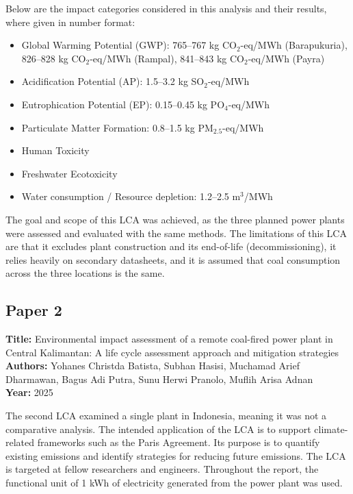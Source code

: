 \documentclass[9pt]{extarticle}
\begin{document}
Below are the impact categories considered in this analysis and their results,
where given in number format:
\begin{itemize}
    \item Global Warming Potential (GWP): 765--767 kg CO$_2$-eq/MWh (Barapukuria), 826--828 kg CO$_2$-eq/MWh (Rampal), 841--843 kg CO$_2$-eq/MWh (Payra)
    \item Acidification Potential (AP): 1.5--3.2 kg SO$_2$-eq/MWh
    \item Eutrophication Potential (EP): 0.15--0.45 kg PO$_4$-eq/MWh
    \item Particulate Matter Formation: 0.8--1.5 kg PM$_{2.5}$-eq/MWh
    \item Human Toxicity
    \item Freshwater Ecotoxicity
    \item Water consumption / Resource depletion: 1.2--2.5 m$^3$/MWh
\end{itemize}

The goal and scope of this LCA was achieved, as the three planned power plants were
assessed and evaluated with the same methods. The limitations of this LCA are that it
excludes plant construction and its end-of-life (decommissioning), it relies heavily
on secondary datasheets, and it is assumed that coal consumption across the three
locations is the same.

\newpage
\subsection{Paper 2 \parencite{BATISTA2025107365}}
\textbf{Title:} Environmental impact assessment of a remote coal-fired power plant in Central Kalimantan: A life cycle assessment approach and mitigation strategies\\
\textbf{Authors:} Yohanes Christda Batista, Subhan Hasisi, Muchamad Arief Dharmawan, Bagus Adi Putra, Sunu Herwi Pranolo, Muflih Arisa Adnan\\
\textbf{Year:} 2025

The second LCA examined a single plant in Indonesia, meaning it was not a comparative
analysis. The intended application of the LCA is to support climate-related frameworks such as the
Paris Agreement. Its purpose is to quantify existing emissions and identify strategies
for reducing future emissions. The LCA is targeted at fellow researchers
and engineers. Throughout the report, the functional unit of 1 kWh of electricity
generated from the power plant was used.
\end{document}
